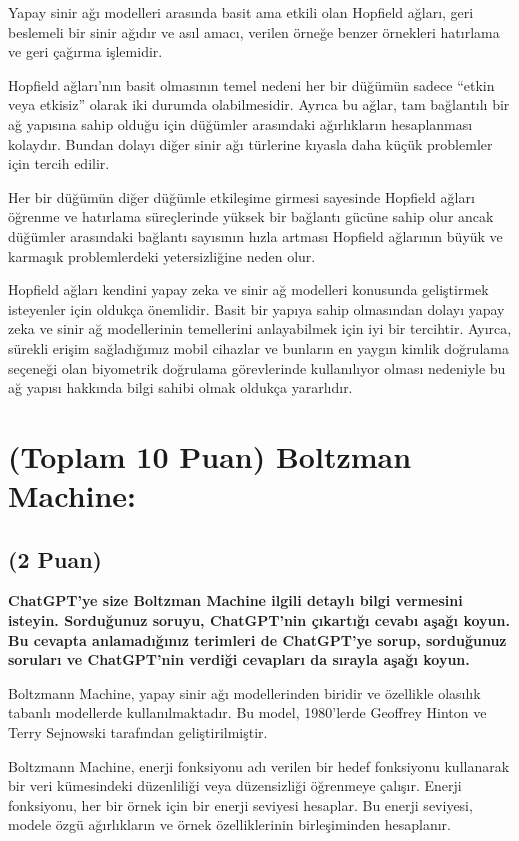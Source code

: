 \documentclass[11pt]{article}
\begin{document}
Yapay sinir ağı modelleri arasında basit ama etkili olan Hopfield ağları, geri beslemeli bir sinir ağıdır ve asıl amacı, verilen örneğe benzer örnekleri hatırlama ve geri çağırma işlemidir.

Hopfield ağları’nın basit olmasının temel nedeni her bir düğümün sadece “etkin veya etkisiz” olarak iki durumda olabilmesidir. Ayrıca bu ağlar, tam bağlantılı bir ağ yapısına sahip olduğu için düğümler arasındaki ağırlıkların hesaplanması kolaydır. Bundan dolayı diğer sinir ağı türlerine kıyasla daha küçük problemler için tercih edilir.

Her bir düğümün diğer düğümle etkileşime girmesi sayesinde Hopfield ağları öğrenme ve hatırlama süreçlerinde yüksek bir bağlantı gücüne sahip olur ancak düğümler arasındaki bağlantı sayısının hızla artması Hopfield ağlarının büyük ve karmaşık problemlerdeki yetersizliğine neden olur.

Hopfield ağları kendini yapay zeka ve sinir ağ modelleri konusunda geliştirmek isteyenler için oldukça önemlidir. Basit bir yapıya sahip olmasından dolayı yapay zeka ve sinir ağ modellerinin temellerini anlayabilmek için iyi bir tercihtir. Ayırca, sürekli erişim sağladığımız mobil cihazlar ve bunların en yaygın kimlik doğrulama seçeneği olan biyometrik doğrulama görevlerinde kullanılıyor olması nedeniyle bu ağ yapısı hakkında bilgi sahibi olmak oldukça yararlıdır.

\section{(Toplam 10 Puan) Boltzman Machine:}

\subsection{(2 Puan)} \textbf{ChatGPT’ye size Boltzman Machine ilgili detaylı bilgi vermesini isteyin. Sorduğunuz soruyu, ChatGPT'nin çıkartığı cevabı aşağı koyun. Bu cevapta anlamadığınız terimleri de ChatGPT’ye sorup, sorduğunuz soruları ve ChatGPT’nin verdiği cevapları da sırayla aşağı koyun.}

Boltzmann Machine, yapay sinir ağı modellerinden biridir ve özellikle olasılık tabanlı modellerde kullanılmaktadır. Bu model, 1980'lerde Geoffrey Hinton ve Terry Sejnowski tarafından geliştirilmiştir.

Boltzmann Machine, enerji fonksiyonu adı verilen bir hedef fonksiyonu kullanarak bir veri kümesindeki düzenliliği veya düzensizliği öğrenmeye çalışır. Enerji fonksiyonu, her bir örnek için bir enerji seviyesi hesaplar. Bu enerji seviyesi, modele özgü ağırlıkların ve örnek özelliklerinin birleşiminden hesaplanır.
\end{document}
